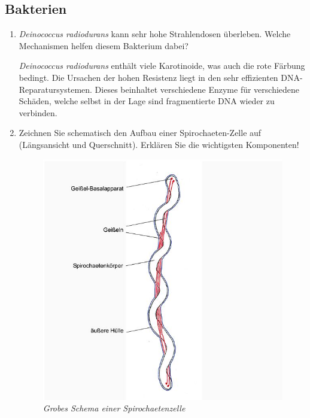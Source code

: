 \subsection{Bakterien}
\begin{enumerate}
	\item \emph{Deinococcus radiodurans} kann sehr hohe Strahlendosen überleben. Welche Mechanismen helfen diesem Bakterium dabei?
		
		\emph{Deinococcus radiodurans} enthält viele Karotinoide,
		was auch die rote Färbung bedingt.
		Die Ursachen der hohen Resistenz liegt in den sehr effizienten DNA-Reparatursystemen.
		Dieses beinhaltet verschiedene Enzyme für verschiedene Schäden,
		welche selbst in der Lage sind fragmentierte DNA wieder zu verbinden.

	\item Zeichnen Sie schematisch den Aufbau einer Spirochaeten-Zelle auf (Längsansicht und Querschnitt). Erklären Sie die wichtigsten Komponenten!
		
		\begin{figure}[ht!]
		\begin{center}
		\includegraphics[scale=0.42]{./pictures/schema_spiro_596}
		\end{center}
		\caption{\slshape{Grobes Schema einer Spirochaetenzelle}}
		\label{fig:spiroschema}
		\end{figure}
			

\end{enumerate}

